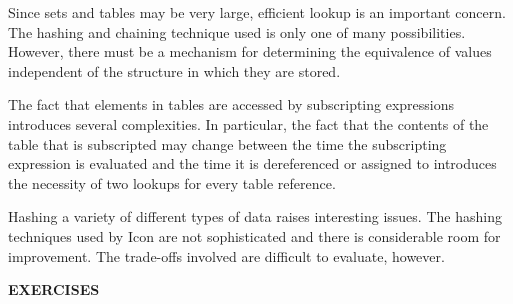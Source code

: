 Since sets and tables may be very large, efficient lookup is an
important concern. The hashing and chaining technique used is only one
of many possibilities. However, there must be a mechanism for
determining the equivalence of values independent of the structure in
which they are stored.

The fact that elements in tables are accessed by subscripting
expressions introduces several complexities. In particular, the fact
that the contents of the table that is subscripted may change between
the time the subscripting expression is evaluated and the time it is
dereferenced or assigned to introduces the necessity of two lookups
for every table reference.

Hashing a variety of different types of data raises interesting
issues. The hashing techniques used by Icon are not sophisticated and
there is considerable room for improvement. The trade-offs involved
are difficult to evaluate, however.

\bigskip

\noindent\textbf{EXERCISES}

